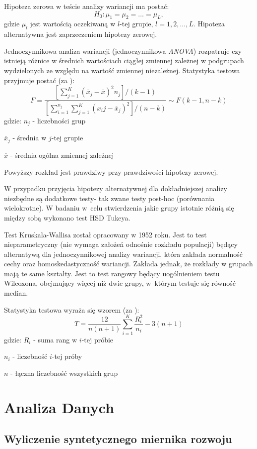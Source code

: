 \documentclass{amuthesis}
\begin{document}
Hipoteza zerowa w teście analizy wariancji ma postać: \[H_0:\mu_1=\mu_2=\dots=\mu_L,\]
gdzie \(\mu_l\) jest wartością oczekiwaną w \(l\)-tej grupie, \(l=1,2,\dots,L\). Hipoteza alternatywna jest zaprzeczeniem hipotezy zerowej.

Jednoczynnikowa analiza wariancji (jednoczynnikowa \emph{ANOVA}) rozpatruje czy istnieją różnice w średnich wartościach ciągłej zmiennej zależnej w podgrupach wydzielonych ze względu na wartość zmiennej niezależnej.
Statystyka testowa przyjmuje postać (za \textcite{wariancja}):
\[ F=\frac{[\sum_{j=1}^K(\overline x_j - \overline x)^2n_j]/(k-1)}
{[\sum_{i=1}^{n_j}\sum_{j=1}^K(x_ij- \overline x_j)^2]/(n-k)}
\sim F(k-1,n-k)
\]
gdzie:
\(n_j\) - liczebności grup

\(\overline x_j\) - średnia w \(j\)-tej grupie

\(\overline x\) - średnia ogólna zmiennej zależnej

Powyższy rozkład jest prawdziwy przy prawdziwości hipotezy zerowej.

W przypadku przyjęcia hipotezy alternatywnej dla dokładniejszej analizy niezbędne są dodatkowe testy- tak zwane testy post-hoc (porównania wielokrotne).
W badaniu w~celu stwierdzenia jakie grupy istotnie różnią się między sobą wykonano test HSD Tukeya.

Test Kruskala-Wallisa został opracowany w 1952 roku.
Jest to test nieparametryczny (nie wymaga założeń odnośnie rozkładu populacji) będący alternatywą dla jednoczynnikowej analizy wariancji, która zakłada normalność cechy oraz homoskedastyczność wariancji.
Zakłada jednak, że rozkłady w grupach mają te same kształty.
Jest to test rangowy będący uogólnieniem testu Wilcoxona, obejmujący więcej niż dwie grupy, w~którym testuje się równość median.

Statystyka testowa wyraża się wzorem (za \textcite{kraskall}):
\[T=\frac{12}{n(n+1)}\sum_{i=1}^K\frac{R^2_i}{n_i}-3(n+1)
\]
gdzie:
\(R_i\) - suma rang w \(i\)-tej próbie

\(n_i\) - liczebność \(i\)-tej próby

\(n\) - łączna liczebność wszystkich grup

\hypertarget{ad}{%
\chapter{Analiza Danych}\label{ad}}

\hypertarget{miernik}{%
\section{Wyliczenie syntetycznego miernika rozwoju}\label{miernik}}
\end{document}
